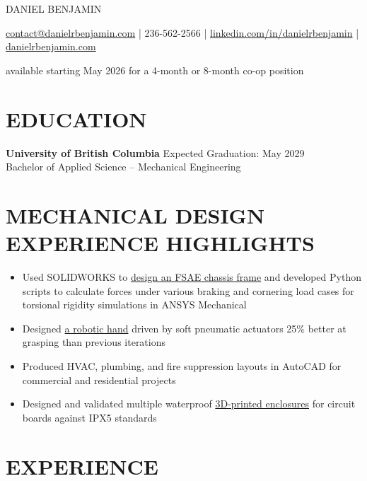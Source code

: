 \documentclass[11pt]{article}       %
\begin{document}
\centerline{\Huge \color{accentColour} DANIEL BENJAMIN}

\vspace{5pt}

\centerline{\href{mailto:contact@danielrbenjamin.com}{contact@danielrbenjamin.com} | 236-562-2566 | \href{https://www.linkedin.com/in/danielrbenjamin}{linkedin.com/in/danielrbenjamin} | \href{https://www.danielrbenjamin.com/}{danielrbenjamin.com}}

\centerline{available starting May 2026 for a 4-month or 8-month co-op position}

\vspace{-6.5pt}

\section*{EDUCATION}
\textbf{University of British Columbia} \hfill Expected Graduation: May 2029
\\Bachelor of Applied Science – Mechanical Engineering

\vspace{-6.5pt}

\section*{MECHANICAL DESIGN EXPERIENCE HIGHLIGHTS}
\begin{itemize}
  \item Used SOLIDWORKS to \href{https://www.danielrbenjamin.com/projects/formula-frame-design.html}{design an FSAE chassis frame} and developed Python scripts to calculate forces under various braking and cornering load cases for torsional rigidity simulations in ANSYS Mechanical
  \item Designed \href{https://www.danielrbenjamin.com/projects/MEMS-hand.html}{a robotic hand} driven by soft pneumatic actuators 25\% better at grasping than previous iterations
  \item Produced HVAC, plumbing, and fire suppression layouts in AutoCAD for commercial and residential projects
  \item Designed and validated multiple waterproof \href{https://www.danielrbenjamin.com/projects/formula.html}{3D-printed enclosures} for circuit boards against IPX5 standards
\end{itemize}

\section*{EXPERIENCE}
\end{document}

